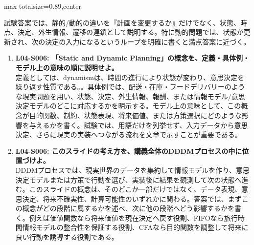 \begin{minipage}[t]{0.58\textwidth}
\begin{adjustbox}{max totalsize={\textwidth}{0.89\textheight},center}
\begin{minipage}{\textwidth}
試験答案では、静的/動的の違いを『計画を変更するか』だけでなく、状態、時点、決定、外生情報、遷移の連鎖として説明する。特に動的問題では、状態が更新され、次の決定の入力になるというループを明確に書くと満点答案に近づく。\par{}\begin{enumerate}\item \textbf{L04-S006: 「Static and Dynamic Planning」の概念を、定義・具体例・モデル上の意味の順に説明せよ。}\\定義としては、dynamismは、時間の進行により状態が変わり、意思決定を繰り返す性質である。。具体例では、配送・在庫・フードデリバリーのような現実問題を用い、状態、決定、外生情報、報酬、または情報モデル/意思決定モデルのどこに対応するかを明示する。モデル上の意味として、この概念が目的関数、制約、状態表現、将来価値、または方策選択にどのような影響を与えるかを書く。試験では、用語だけを列挙せず、入力データから意思決定、さらに現実の実装へつながる流れを文章で示すことが重要である。\item \textbf{L04-S006: このスライドの考え方を、講義全体のDDDMプロセスの中に位置づけよ。}\\DDDMプロセスでは、現実世界のデータを集約して情報モデルを作り、意思決定モデルまたは方策で行動を選び、実装後に結果を観測して次の状態へ進む。このスライドの概念は、そのどこか一部だけではなく、データ表現、意思決定、将来不確実性、計算可能性のいずれかに関わる。答案では、まずこの概念がどの段階に属するかを述べ、次に他の段階へどう影響するかを書く。例えば価値関数なら将来価値を現在決定へ戻す役割、FIFOなら旅行時間情報モデルの整合性を保証する役割、CFAなら目的関数を調整して将来に良い行動を誘導する役割である。\end{enumerate}
\end{minipage}
\end{adjustbox}
\end{minipage}


